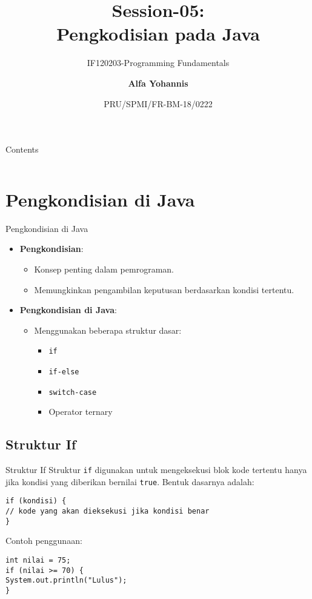 \documentclass[aspectratio=169, table]{beamer}
\subtitle{IF120203-Programming Fundamentals}
\title{Session-05:\\\LARGE{Pengkodisian pada Java\\}
\vspace{10pt}}
\date[Serial]{\scriptsize {PRU/SPMI/FR-BM-18/0222}}
\author[Pradita]{\small{\textbf{Alfa Yohannis}}}
\begin{document}
\frame{\titlepage}

\begin{frame}[fragile]{Contents}
\vspace{15pt}
\begin{columns}[t]
\begin{column}{.5\textwidth}
\tableofcontents[sections={1-8}]
\end{column}
\begin{column}{.5\textwidth}
\tableofcontents[sections={9-20}]
\end{column}
\end{columns}
\end{frame}

\section{Pengkondisian di Java}

\begin{frame}[fragile]{Pengkondisian di Java}
\begin{itemize}
\item \textbf{Pengkondisian}:
\begin{itemize}
\item Konsep penting dalam pemrograman.
\item Memungkinkan pengambilan keputusan berdasarkan kondisi tertentu.
\end{itemize}

\item \textbf{Pengkondisian di Java}:
\begin{itemize}
\item Menggunakan beberapa struktur dasar:
\begin{itemize}
	\item \texttt{if}
	\item \texttt{if-else}
	\item \texttt{switch-case}
	\item Operator ternary
\end{itemize}
\end{itemize}
\end{itemize}
\end{frame}


\subsection{Struktur If}
\begin{frame}[fragile]{Struktur If}
Struktur \texttt{if} digunakan untuk mengeksekusi blok kode tertentu hanya jika kondisi yang diberikan bernilai \texttt{true}. Bentuk dasarnya adalah:

\begin{lstlisting}[style=JavaStyle]
if (kondisi) {
// kode yang akan dieksekusi jika kondisi benar
}
\end{lstlisting}

Contoh penggunaan:

\begin{lstlisting}[style=JavaStyle]
int nilai = 75;
if (nilai >= 70) {
System.out.println("Lulus");
}
\end{lstlisting}
\end{frame}
\end{document}
